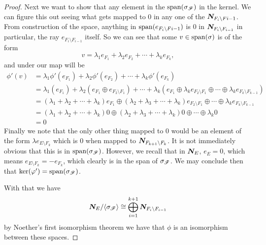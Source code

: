 \documentclass[12pt,oneside]{../../sfsuthesis}
\begin{document}
\begin{proof}
    Next we want to show that any element in the \( \operatorname{span}(\sigma_{\mathscr{F}}) \) in the kernel.
    We can figure this out seeing what gets mapped to 0 in any one of the \( \bm{N}_{F_i \setminus F i-1} \).
    From construction of the space, anything in \( \operatorname{span}( e_{F_i \setminus F{i-1}}) \) is 0 in \( \bm{N}_{F_i \setminus F_{i-1}} \) in particular, the ray \( e_{F_i \setminus F_{i-1}} \) itself.
    So we can see that some \( v \in \operatorname{span}( \sigma ) \) is of the form
    \[
        v = \lambda_1 e_{F_1} + \lambda_2 e_{F_2} + \cdots + \lambda_k e_{F_k},
    \]
    and under our map will be
    \begin{align*}
        \phi'(v) & = \lambda_1 \phi'(e_{F_1}) + \lambda_2 \phi'(e_{F_2}) + \cdots + \lambda_k \phi'(e_{F_k})                                                                                                                                                 \\
                 & = \lambda_1 \left(e_{F_1}\right) + \lambda_2 \left(e_{F_1} \oplus  e_{F_2 \setminus F_1}\right) + \cdots + \lambda_k \left(e_{F_1} \oplus \lambda_k e_{F_2 \setminus F_1} \oplus \cdots \oplus \lambda_k e_{F_k \setminus F_{k-1}}\right) \\
                 & = (\lambda_1 + \lambda_2 + \cdots + \lambda_k) e_{F_1} \oplus (\lambda_2 + \lambda_3 + \cdots + \lambda_k) e_{F_2 \setminus F_1} \oplus \cdots \oplus \lambda_k e_{F_k \setminus F_{k-1}}                                                 \\
                 & = (\lambda_1 + \lambda_2 + \cdots + \lambda_k) 0 \oplus (\lambda_2 + \lambda_3 + \cdots + \lambda_k) 0 \oplus \cdots \oplus \lambda_k 0                                                                                                   \\
                 & = 0
    \end{align*}
    Finally we note that the only other thing mapped to 0 would be an element of the form \( \lambda e_{E \setminus F_k} \) which is 0 when mapped to \( \bm{N}_{F_{k+1} \setminus F_k} \).
    It is not immediately obvious that this is in \( \operatorname{span}(\sigma_{\mathscr{F}}) \).
    However, we recall that in \( \bm{N}_E  \), \( e_E = 0 \), which means \( e_{E \setminus F_k} = -e_{F_k} \), which clearly is in the span of \( \sigma_{\mathscr{F}} \).
    We may conclude then that \( \ker( \varphi' ) = \operatorname{span}(\sigma_{\mathscr{F}}) \).

    With that we have
    \[
        \bm{N}_E/\langle \sigma_{\mathscr{F}} \rangle \cong \bigoplus_{i=1}^{k+1} \bm{N}_{F_i \setminus F_{i-1}}
    \]
    by Noether's first isomorphism theorem we have that \( \phi \) is an isomorphism between these spaces.
\end{proof}
\end{document}
